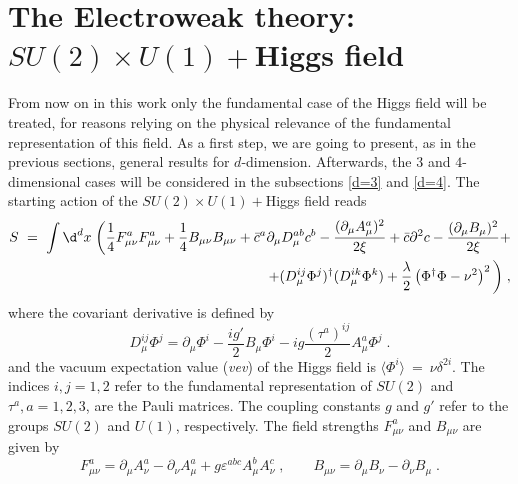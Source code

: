 

\chapter{The Electroweak theory: $SU(2)\times U(1)+$Higgs field}
\label{The Electroweak theory}

From now on in this work only the fundamental case of the Higgs field will be treated, for reasons relying on the physical relevance of the fundamental representation of this field. As a first step, we are going to present, as in the previous sections, general results for $d$-dimension. Afterwards, the $3$ and $4$-dimensional cases will be considered in the subsections \ref{d=3} and \ref{d=4}. The starting action of the $SU(2) \times U(1)+$Higgs field reads
\begin{eqnarray}
S ~=~ \int \d^{d}x  \;  \bigg(\frac{1}{4}  F_{\mu \nu }^{a} F_{\mu \nu }^{a}  +  \frac{1}{4} B_{\mu\nu} B_{\mu\nu} +{\bar c}^a \partial_\mu D^{ab}_\mu c^b - \frac{(\partial_\mu A^a_\mu)^{2}}{2\xi} 
 + {\bar c}\partial^2 c  - \frac{(\partial_\mu B_\mu)^{2}}{2\xi}  +
\nonumber \\
+
(D_{\mu }^{ij}\Phi^{j})^{\dagger}( D_{\mu }^{ik}\Phi^{k})+\frac{\lambda }{2}\left(\Phi^{\dagger}\Phi - \nu^{2}\right)^{2}   \bigg)  \;,
\label{Sf}
\end{eqnarray}
where the covariant derivative is defined by
\begin{equation}
D_{\mu }^{ij}\Phi^{j} =\partial _{\mu }\Phi^{i} - \frac{ig'}{2}B_{\mu}\Phi^{i} -   ig \frac{(\tau^a)^{ij}}{2}A_{\mu }^{a}\Phi^{j}  \;.
\end{equation}
and the vacuum expectation value (\textit{vev}) of the Higgs field is $\langle \Phi^{i} \rangle ~=~ \nu\delta^{2i}$.
The indices $i,j=1,2$ refer to the fundamental representation of $SU(2)$ and $\tau^a, a=1,2,3$, are the Pauli matrices. The coupling constants $g$ and $g'$ refer to the groups $SU(2)$ and $U(1)$, respectively. The field strengths $F^a_{\mu\nu}$ and $B_{\mu\nu}$ are given by
\begin{equation}
F^a_{\mu\nu} = \partial_\mu A^a_\nu -\partial_\nu A^a_\mu + g \varepsilon^{abc} A^b_\mu A^c_\nu \;, \qquad B_{\mu \nu} = \partial_\mu B_\nu -\partial_\nu B_\mu  \;.
\label{fs}
\end{equation}

